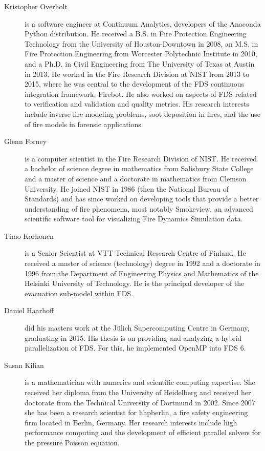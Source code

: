 \begin{description}
\item[Kristopher Overholt] is a software engineer at Continuum Analytics, developers of the Anaconda Python distribution. He received a B.S. in Fire Protection Engineering Technology from the University of Houston-Downtown in 2008, an M.S. in Fire Protection Engineering from Worcester Polytechnic Institute in 2010, and a Ph.D. in Civil Engineering from The University of Texas at Austin in 2013. He worked in the Fire Research Division at NIST from 2013 to 2015, where he was central to the development of the FDS continuous integration framework, Firebot.  He also worked on aspects of FDS related to verification and validation and quality metrics. His research interests include inverse fire modeling problems, soot deposition in fires, and the use of fire models in forensic applications.

\item[Glenn Forney] is a computer scientist in the Fire Research Division of NIST.  He received a bachelor of science degree in mathematics from Salisbury State College and a master of science and a doctorate in mathematics from Clemson University.  He joined NIST in 1986 (then the National Bureau of Standards) and has since worked on developing tools that provide a better understanding of fire phenomena, most notably Smokeview, an advanced scientific software tool for visualizing Fire Dynamics Simulation data.

\item[Timo Korhonen] is a Senior Scientist at VTT Technical Research Centre of Finland. He received a master of science (technology) degree in 1992 and a doctorate in 1996 from the Department of Engineering Physics and Mathematics of the Helsinki University of Technology. He is the principal developer of the evacuation sub-model within FDS.

\item[Daniel Haarhoff] did his masters work at the J\"ulich Supercomputing Centre in Germany, graduating in 2015. His thesis is on providing and analyzing a hybrid parallelization of FDS. For this, he implemented OpenMP into FDS 6.

\item[Susan Kilian] is a mathematician with numerics and scientific computing expertise. She received her diploma from the University of Heidelberg and received her doctorate from the Technical University of Dortmund in 2002. Since 2007 she has been a research scientist for hhpberlin, a fire safety engineering firm located in Berlin, Germany. Her research interests include high performance computing and the development of efficient parallel solvers for the pressure Poisson equation.


\end{description}
